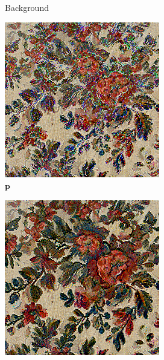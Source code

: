 \begin{figure}[]
\begin{subfigure}{\textwidth}
\begin{subfigure}{0.24\textwidth}
            \caption*{Background}
        \end{subfigure}
        \hfill
        \begin{subfigure}{0.24\textwidth}
            \centering
            \includegraphics[width=\textwidth]{images/04-experiment01/flowers/1000/threshold_im.jpg}
            \caption*{\(\bm{p}\)}
        \end{subfigure}
        \hfill
        \begin{subfigure}{0.24\textwidth}
            \centering
            \includegraphics[width=\textwidth]{images/04-experiment01/flowers/1000/threshold_proj.jpg}

\end{subfigure}
\end{subfigure}
\end{figure}
